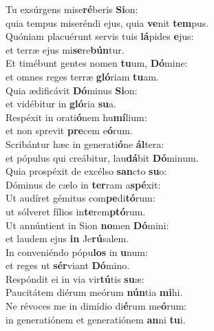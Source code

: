 \evenverse Tu exsúrgens mise\textbf{ré}beris \textbf{Si}on:~\*\\
\evenverse quia tempus miseréndi ejus, quia \textbf{ve}nit \textbf{tem}pus.\\
\oddverse Quóniam placuérunt servis tuis \textbf{lá}pides \textbf{e}jus:~\*\\
\oddverse et terræ ejus mi\textbf{se}re\textbf{bún}tur.\\
\evenverse Et timébunt gentes nomen \textbf{tu}um, \textbf{Dó}mine:~\*\\
\evenverse et omnes reges terræ \textbf{gló}riam \textbf{tu}am.\\
\oddverse Quia ædificávit \textbf{Dó}minus \textbf{Si}on:~\*\\
\oddverse et vidébitur in \textbf{gló}ria \textbf{su}a.\\
\evenverse Respéxit in orati\textbf{ó}nem hu\textbf{mí}lium:~\*\\
\evenverse et non sprevit \textbf{pre}cem e\textbf{ó}rum.\\
\oddverse Scribántur hæc in generati\textbf{ó}ne \textbf{ál}tera:~\*\\
\oddverse et pópulus qui creábitur, lau\textbf{dá}bit \textbf{Dó}minum.\\
\evenverse Quia prospéxit de excélso \textbf{san}cto \textbf{su}o:~\*\\
\evenverse Dóminus de cælo in \textbf{ter}ram a\textbf{spé}xit:\\
\oddverse Ut audíret gémitus com\textbf{pe}di\textbf{tó}rum:~\*\\
\oddverse ut sólveret fílios in\textbf{te}rem\textbf{ptó}rum.\\
\evenverse Ut annúntient in Sion \textbf{no}men \textbf{Dó}mini:~\*\\
\evenverse et laudem ejus \textbf{in} Je\textbf{rú}salem.\\
\oddverse In conveniéndo pópu\textbf{los} in \textbf{u}num:~\*\\
\oddverse et reges ut \textbf{sér}viant \textbf{Dó}mino.\\
\evenverse Respóndit ei in via vir\textbf{tú}tis \textbf{su}æ:~\*\\
\evenverse Paucitátem diérum meórum \textbf{nún}tia \textbf{mi}hi.\\
\oddverse Ne révoces me in dimídio di\textbf{é}rum me\textbf{ó}rum:~\*\\
\oddverse in generatiónem et generatiónem \textbf{an}ni \textbf{tu}i.\\
